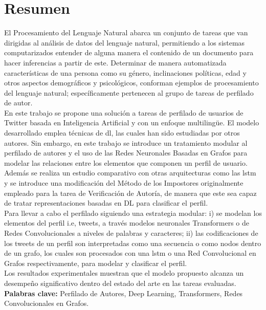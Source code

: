 \chapter*{Resumen}


El Procesamiento del Lenguaje Natural abarca un conjunto de tareas que van dirigidas al análisis de datos del lenguaje natural, permitiendo a los sistemas computarizados entender de alguna manera el contenido de un documento para hacer inferencias a partir de este. Determinar de manera automatizada características de una persona como su género, inclinaciones políticas, edad y otros aspectos demográficos y psicológicos, conforman ejemplos de procesamiento del lenguaje natural; específicamente pertenecen al grupo de tareas de perfilado de autor.
\\
En este trabajo se propone una solución a tareas de perfilado de usuarios de Twitter basada en Inteligencia Artificial y con un enfoque multilingüe. El modelo desarrollado emplea técnicas de \ac{dl}, las cuales han sido estudiadas por otros autores. Sin embargo, en este trabajo se introduce un tratamiento modular al perfilado de autores y el uso de las Redes Neuronales Basadas en Grafos para modelar las relaciones entre los elementos que componen un perfil de usuario. Además se realiza un estudio comparativo con otras arquitecturas como las \ac{lstm} y se introduce una modificación del Método de los Impostores originalmente empleado para la tarea de Verificación de Autoría, de manera que este sea capaz de tratar representaciones basadas en DL para clasificar el perfil.
\\
Para llevar a cabo el perfilado siguiendo una estrategia modular: i) se modelan los elementos del perfil i.e, tweets, a través modelos neuronales Transformers o de Redes Convolucionales a niveles de palabras y caracteres; ii) las codificaciones de los tweets de un perfil son interpretadas como una secuencia o como nodos dentro de un grafo, los cuales son procesados con una \ac{lstm} o una Red Convolucional en Grafos respectivamente, para modelar y clasificar el perfil. \\Los resultados experimentales muestran que el modelo propuesto alcanza un desempeño significativo dentro del estado del arte en las tareas evaluadas.
\\

\textbf{Palabras clave:} Perfilado de Autores, Deep Learning, Transformers, Redes Convolucionales en Grafos.
